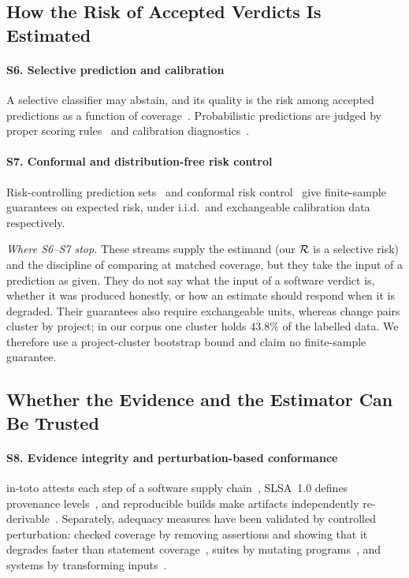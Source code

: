 \subsection{How the Risk of Accepted Verdicts Is Estimated}
\paragraph*{S6. Selective prediction and calibration} A selective classifier may abstain, and its quality is the risk among accepted predictions as a function of coverage~\cite{chow1970optimum,elyaniv2010foundations,geifman2017selective,hendrickx2024machine}. Probabilistic predictions are judged by proper scoring rules~\cite{brier1950verification} and calibration diagnostics~\cite{niculescumizil2005predicting,guo2017calibration}.

\paragraph*{S7. Conformal and distribution-free risk control} Risk-controlling prediction sets~\cite{bates2021distribution} and conformal risk control~\cite{angelopoulos2024conformal} give finite-sample guarantees on expected risk, under i.i.d.\ and exchangeable calibration data respectively.

\emph{Where S6--S7 stop.} These streams supply the estimand (our $\mathcal{R}$ is a selective risk) and the discipline of comparing at matched coverage, but they take the input of a prediction as given. They do not say what the input of a software verdict is, whether it was produced honestly, or how an estimate should respond when it is degraded. Their guarantees also require exchangeable units, whereas change pairs cluster by project; in our corpus one cluster holds 43.8\% of the labelled data. We therefore use a project-cluster bootstrap bound and claim no finite-sample guarantee.

\subsection{Whether the Evidence and the Estimator Can Be Trusted}
\paragraph*{S8. Evidence integrity and perturbation-based conformance} in-toto attests each step of a software supply chain~\cite{torresarias2019intoto}, SLSA~1.0 defines provenance levels~\cite{slsa2023spec}, and reproducible builds make artifacts independently re-derivable~\cite{lamb2022reproducible}. Separately, adequacy measures have been validated by controlled perturbation: checked coverage by removing assertions and showing that it degrades faster than statement coverage~\cite{schuler2011assessing}, suites by mutating programs~\cite{jia2011analysis,niedermayr2016will}, and systems by transforming inputs~\cite{chen2018metamorphic}.

